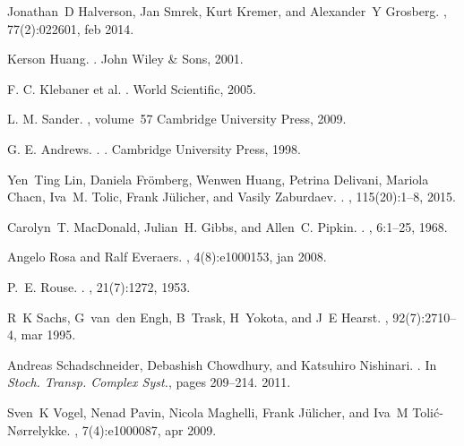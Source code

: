 \documentclass[aps,showpacs,twocolumn,floatfix,prx,superscriptaddress]{revtex4-1}
\begin{document}
\begin{thebibliography}{10}
Jonathan~D Halverson, Jan Smrek, Kurt Kremer, and Alexander~Y Grosberg.
, 77(2):022601, feb 2014.

Kerson Huang.
.
\newblock John Wiley {\&} Sons, 2001.

F. C. Klebaner et al.
.
\newblock World Scientific, 2005.

L. M. Sander.
, volume~57
\newblock Cambridge University Press, 2009.

G. E. Andrews.
.
.
\newblock Cambridge University Press, 1998.


Yen~Ting Lin, Daniela Fr{\"{o}}mberg, Wenwen Huang, Petrina Delivani, Mariola
  Chacn, Iva~M. Tolic, Frank J{\"{u}}licher, and Vasily Zaburdaev.
.
, 115(20):1--8, 2015.

Carolyn~T. MacDonald, Julian~H. Gibbs, and Allen~C. Pipkin.
.
, 6:1--25, 1968.

Angelo Rosa and Ralf Everaers.
, 4(8):e1000153, jan 2008.

P.~E. Rouse.
.
, 21(7):1272, 1953.

R~K Sachs, G~van~den Engh, B~Trask, H~Yokota, and J~E Hearst.
, 92(7):2710--4, mar 1995.

Andreas Schadschneider, Debashish Chowdhury, and Katsuhiro Nishinari.
.
\newblock In {\em Stoch. Transp. Complex Syst.}, pages 209--214. 2011.

Sven~K Vogel, Nenad Pavin, Nicola Maghelli, Frank J{\"{u}}licher, and Iva~M
  Toli{\'{c}}-N{\o}rrelykke.
, 7(4):e1000087, apr 2009.

\end{thebibliography}
\end{document}
